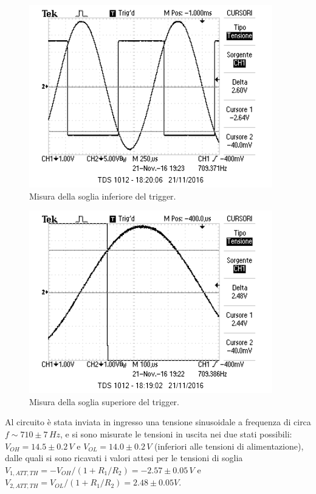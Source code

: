 \documentclass[10pt,a4paper]{article}
\begin{document}
\begin{figure}[htb!]
\centering
\includegraphics[scale=1.0]{immagini/FotoRicordoVth1.png}
\caption{Misura della soglia inferiore del trigger.}
\label{sogliameno}
\end{figure}

\begin{figure}[htb!]
\centering
\includegraphics[scale=1.0]{immagini/FotoRicordoVth2.png}
\caption{Misura della soglia superiore del trigger.}
\label{sogliapiu}
\end{figure}

Al circuito è stata inviata in ingresso una tensione sinusoidale a frequenza di circa $f \sim 710 \pm 7 \, Hz$, e si sono misurate le tensioni in uscita nei due stati possibili: $V_{OH} = 14.5\pm 0.2 \, V$ e $V_{OL} = 14.0\pm0.2 \, V$ (inferiori alle tensioni di alimentazione), dalle quali si sono ricavati i valori attesi per le tensioni di soglia $V_{1,ATT,TH}= -V_{OH}/(1+R_1/R_2)= -2.57 \pm 0.05 \, V$ e $V_{2,ATT,TH}= V_{OL}/(1+R_1/R_2) = 2.48 \pm 0.05 V$. 
\end{document}
